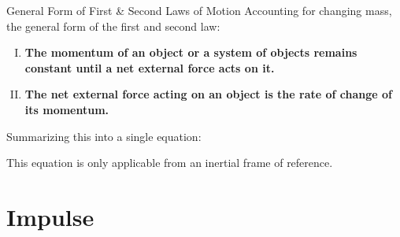 \documentclass[12pt,compress,aspectratio=169]{beamer}
\begin{document}
\begin{frame}{General Form of First \& Second Laws of Motion}
  Accounting for changing mass, the general form of the first and second law:
  \begin{enumerate}[I.]
  \item\textbf{The momentum of an object or a system of objects remains
    constant until a net external force acts on it.}
  \item\textbf{The net external force acting on an object
    is the rate of change of its momentum.}
  \end{enumerate}
  Summarizing this into a single equation:


  This equation is only applicable from an inertial frame of reference.
\end{frame}



%
%  
%



\section{Impulse}
\end{document}
